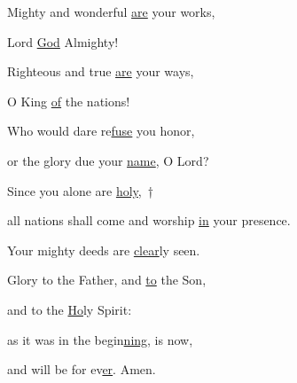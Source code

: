 \noindent Mighty and wonderful \uline{are} your works,~\GreStar{}~\nopagebreak

Lord \uline{God} Almighty!

\noindent Righteous and true \uline{are} your ways,~\GreStar{}~\nopagebreak

O King \uline{of} the nations!

\noindent Who would dare re\uline{fuse} you honor,~\GreStar{}~\nopagebreak

or the glory due your \uline{name}, O Lord?

\noindent Since you alone are \uline{holy},~†~\nopagebreak

all nations shall come and worship \uline{in} your presence.~\GreStar{}~\nopagebreak

Your mighty deeds are \uline{clear}ly seen.

\noindent Glory to the Father, and \uline{to} the Son,~\GreStar{}~\nopagebreak

and to the \uline{Ho}ly Spirit:

\noindent as it was in the begin\uline{ning}, is now,~\GreStar{}~\nopagebreak

and will be for ev\uline{er}. Amen.

